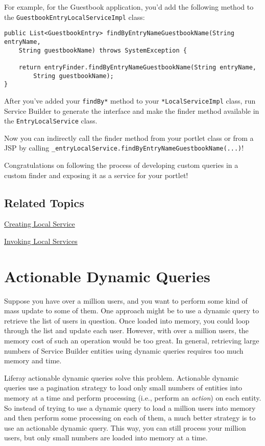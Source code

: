 For example, for the Guestbook application, you'd add the following
method to the \texttt{GuestbookEntryLocalServiceImpl} class:

\begin{verbatim}
public List<GuestbookEntry> findByEntryNameGuestbookName(String entryName,
    String guestbookName) throws SystemException {

    return entryFinder.findByEntryNameGuestbookName(String entryName,
        String guestbookName);
}
\end{verbatim}

After you've added your \texttt{findBy*} method to your
\texttt{*LocalServiceImpl} class, run Service Builder to generate the
interface and make the finder method available in the
\texttt{EntryLocalService} class.

Now you can indirectly call the finder method from your portlet class or
from a JSP by calling
\texttt{\_entryLocalService.findByEntryNameGuestbookName(...)}!

Congratulations on following the process of developing custom queries in
a custom finder and exposing it as a service for your portlet!

\section{Related Topics}\label{related-topics-24}

\href{/docs/7-2/appdev/-/knowledge_base/a/business-logic-with-service-builder}{Creating
Local Service}

\href{/docs/7-2/appdev/-/knowledge_base/a/invoking-local-services}{Invoking
Local Services}

\chapter{Actionable Dynamic Queries}\label{actionable-dynamic-queries}

Suppose you have over a million users, and you want to perform some kind
of mass update to some of them. One approach might be to use a dynamic
query to retrieve the list of users in question. Once loaded into
memory, you could loop through the list and update each user. However,
with over a million users, the memory cost of such an operation would be
too great. In general, retrieving large numbers of Service Builder
entities using dynamic queries requires too much memory and time.

Liferay actionable dynamic queries solve this problem. Actionable
dynamic queries use a pagination strategy to load only small numbers of
entities into memory at a time and perform processing (i.e., perform an
\emph{action}) on each entity. So instead of trying to use a dynamic
query to load a million users into memory and then perform some
processing on each of them, a much better strategy is to use an
actionable dynamic query. This way, you can still process your million
users, but only small numbers are loaded into memory at a time.

